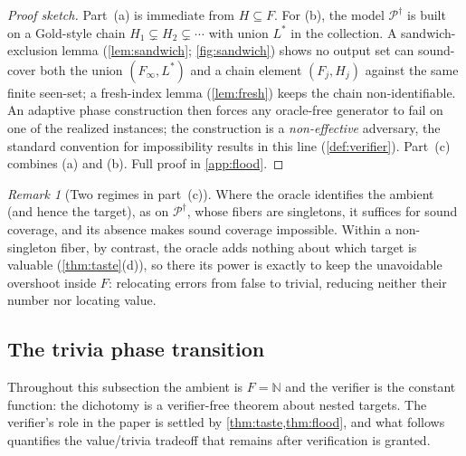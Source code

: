 \documentclass[11pt]{article}
\numberwithin{equation}{section}
\newcommand{\N}{\mathbb{N}}
\newcommand{\mc}[1]{\mathcal{#1}}
\newcommand{\Amb}{F}
\newcommand{\Val}{H}
\newcommand{\Pairs}{\mc{P}}
\theoremstyle{plain}
\theoremstyle{definition}
\theoremstyle{remark}
\newtheorem{remark}[theorem]{Remark}
\begin{document}
\begin{proof}[Proof sketch]
Part~(a) is immediate from $\Val \subseteq \Amb$. For (b), the model $\Pairs^{\dagger}$ is
built on a Gold-style chain $\Val_1 \subsetneq \Val_2 \subsetneq \cdots$ with union $L^*$ in
the collection. A sandwich-exclusion lemma (\cref{lem:sandwich}; \cref{fig:sandwich}) shows no
output set can sound-cover both the union $(\Amb_\infty, L^*)$ and a chain element $(\Amb_j,
\Val_j)$ against the same finite seen-set; a fresh-index lemma (\cref{lem:fresh}) keeps the
chain non-identifiable. An adaptive phase construction then forces any oracle-free generator
to fail on one of the realized instances; the construction is a \emph{non-effective}
adversary, the standard convention for impossibility results in this line
(\cref{def:verifier}). Part~(c) combines (a) and (b). Full proof in \cref{app:flood}.
\end{proof}

\begin{remark}[Two regimes in part~(c)]
Where the oracle identifies the ambient (and hence the target), as on $\Pairs^{\dagger}$,
whose fibers are singletons, it suffices for sound coverage, and its absence makes sound
coverage impossible. Within a non-singleton fiber, by contrast, the oracle adds nothing about
which target is valuable (\cref{thm:taste}(d)), so there its power is exactly to keep the
unavoidable overshoot inside $\Amb$: relocating errors from false to trivial, reducing neither
their number nor locating value.
\end{remark}

\subsection{The trivia phase transition}
\label{sec:res-dichotomy}

Throughout this subsection the ambient is $\Amb = \N$ and the verifier is the constant
function: the dichotomy is a verifier-free theorem about nested targets. The verifier's role
in the paper is settled by \cref{thm:taste,thm:flood}, and what follows quantifies the
value/trivia tradeoff that remains after verification is granted.
\end{document}
